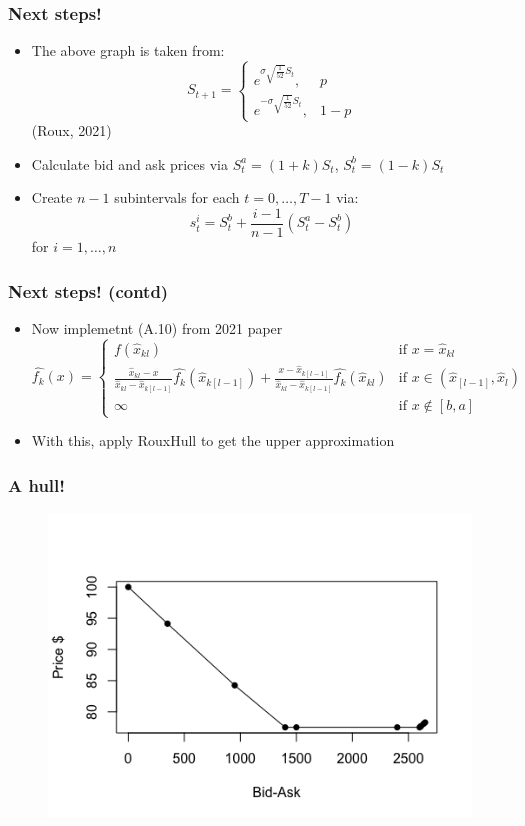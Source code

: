\documentclass{beamer}
\begin{document}
\begin{frame}
    \frametitle{Next steps!}
    \begin{itemize}
        \item The above graph is taken from: $$ S_{t+1} = 
        \begin{cases}
            e^{\sigma\sqrt{\frac{1}{52}}S_t}, & p \\
            e^{-\sigma\sqrt{\frac{1}{52}}S_t}, & 1-p
        \end{cases}
        $$ (Roux, 2021)
        
        \item Calculate bid and ask prices via $S_t^a = (1+k)S_t$, $S_t^b = (1-k)S_t$
        \item Create $n-1$ subintervals for each $t=0,\ldots,T-1$ via: 
        $$
            s^i_t = S^b_t + \frac{i-1}{n-1}\left(S^a_t-S^b_t\right)
        $$ for $i = 1,\ldots,n$
    \end{itemize}
\end{frame}
\begin{frame}
    \frametitle{Next steps! (contd)}
    \begin{itemize}
        \item Now implemetnt (A.10) from 2021 paper$$
        \hat{f_k}(x) = 
        \begin{cases}
            f(\hat{x}_{kl}) & \text{if } x=\hat{x}_{kl} \\
            \frac{\hat{x}_{kl}-x}{\hat{x}_{kl}-\hat{x}_{k[l-1]}}\hat{f_k}(\hat{x}_{k[l-1]}) + \frac{x-\hat{x}_{k[l-1]}}{\hat{x}_{kl}-\hat{x}_{k[l-1]}}\hat{f_k}(\hat{x}_{kl}) & \text{if } x \in (\hat{x}_{[l-1]},\hat{x}_l)\\
            \infty & \text{if } x \notin [b,a]
        \end{cases}
        $$
        \item With this, apply RouxHull to get the upper approximation
    \end{itemize}
\end{frame}

\begin{frame}
    \frametitle{A hull!}
    \begin{figure}
        \center
        \includegraphics[scale=0.6]{../Figures/finalexamplehull.png}
    \end{figure}
\end{frame}
\end{document}
